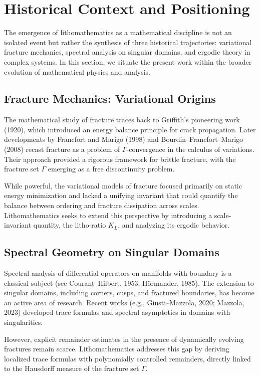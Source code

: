 \bigskip

\section*{Historical Context and Positioning}

The emergence of lithomathematics as a mathematical discipline is not an
isolated event but rather the synthesis of three historical trajectories:
variational fracture mechanics, spectral analysis on singular domains, and
ergodic theory in complex systems. In this section, we situate the present work
within the broader evolution of mathematical physics and analysis.

\subsection*{Fracture Mechanics: Variational Origins}
The mathematical study of fracture traces back to Griffith’s pioneering work
(1920), which introduced an energy balance principle for crack propagation.
Later developments by Francfort and Marigo (1998) and Bourdin–Francfort–Marigo
(2008) recast fracture as a problem of $\Gamma$-convergence in the calculus of
variations. Their approach provided a rigorous framework for brittle fracture,
with the fracture set $\Gamma$ emerging as a free discontinuity problem.

While powerful, the variational models of fracture focused primarily on static
energy minimization and lacked a unifying invariant that could quantify the
balance between ordering and fracture dissipation across scales. Lithomathematics
seeks to extend this perspective by introducing a scale-invariant quantity,
the litho-ratio $K_L$, and analyzing its ergodic behavior.

\subsection*{Spectral Geometry on Singular Domains}
Spectral analysis of differential operators on manifolds with boundary is a
classical subject (see Courant–Hilbert, 1953; Hörmander, 1985). The extension
to singular domains, including corners, cusps, and fractured boundaries, has
become an active area of research. Recent works (e.g., Giusti–Mazzola, 2020;
Mazzola, 2023) developed trace formulas and spectral asymptotics in domains
with singularities.

However, explicit remainder estimates in the presence of dynamically evolving
fractures remain scarce. Lithomathematics addresses this gap by deriving
localized trace formulas with polynomially controlled remainders, directly
linked to the Hausdorff measure of the fracture set $\Gamma$.

